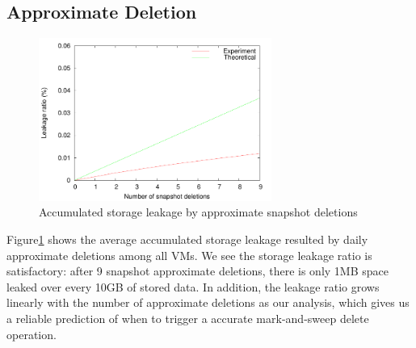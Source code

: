 \subsection{Approximate Deletion}

\begin{figure}
    \centering
    \includegraphics[width=3in]{figures/leakage}
    \caption{Accumulated storage leakage by approximate snapshot deletions}
    \label{fig:leakage}
\end{figure}

Figure\ref{fig:leakage} shows the average accumulated storage leakage resulted by daily
approximate deletions among all VMs. We see the storage leakage ratio is satisfactory: 
after 9 snapshot approximate deletions, there is only 1MB space leaked over every 10GB
of stored data. In addition, the leakage ratio grows linearly with the number of approximate deletions
as our analysis, which gives us a reliable prediction of when to trigger a accurate mark-and-sweep delete operation. 
  

